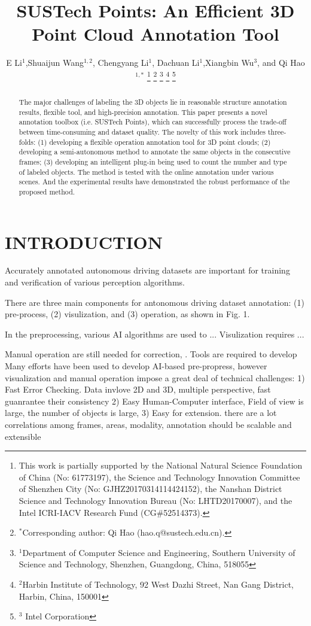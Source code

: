 \documentclass[letterpaper, 10 pt, conference]{ieeeconf}  %
\title{\LARGE \bf
SUSTech Points: An Efficient 3D Point Cloud Annotation Tool
}
\author{E Li$^{1}$,Shuaijun Wang$^{1,2}$,  Chengyang Li$^{1}$, Dachuan Li$^{1}$,Xiangbin Wu$^{3}$, and Qi Hao$^{1,*}$%
\thanks{This work is partially supported by the National Natural Science Foundation of China (No: 61773197), the Science and Technology Innovation Committee of Shenzhen City (No: GJHZ20170314114424152), the Nanshan District Science and Technology Innovation Bureau (No: LHTD20170007), and the Intel ICRI-IACV Research Fund (CG$\#$52514373).}
\thanks{$^{*}$Corresponding author: Qi Hao (hao.q@sustech.edu.cn).}
\thanks{$^{1}$Department of Computer Science and Engineering,
Southern University of Science and Technology, Shenzhen, Guangdong, China, 518055}
\thanks{$^{2}$Harbin Institute of Technology,
92 West Dazhi Street, Nan Gang District, Harbin, China, 150001}%
\thanks{$^{3}$ Intel Corporation}%
}
\begin{document}
\maketitle
\thispagestyle{empty}
\pagestyle{empty}
\begin{abstract}
The major challenges of labeling the 3D objects lie in reasonable structure annotation results, flexible tool, and high-precision annotation. This paper presents a novel annotation toolbox (i.e. SUSTech Points), which can successfully process the trade-off between time-consuming and dataset quality. The novelty of this work includes three-folds: (1) developing a flexible operation annotation tool for 3D point clouds; (2) developing a semi-autonomous method to annotate the same objects in the consecutive frames; (3) developing an intelligent plug-in being used to count the number and type of labeled objects. The method is tested with the online annotation under various scenes. And the experimental results have demonstrated the robust performance of the proposed method.
\end{abstract}






\section{INTRODUCTION}

Accurately annotated autonomous driving datasets are important for training and verification of various perception algorithms.

There are three main components for antonomous driving dataset annotation: (1) pre-process, (2) visulization, and (3) operation, as shown in Fig. 1.

In the preprocessing, various AI algorithms are used to ...
Visulization requires ...

Manual operation are still needed for correction, . 
Tools are required to develop 
Many efforts have been used to develop AI-based pre-propress, however
visualization and manual operation impose a great deal of technical challenges:
1) Fast Error Checking. Data invlove 2D and 3D, multiple perspective, fast guanrantee their consistency
2) Easy Human-Computer interface, Field of view is large, the number of objects is large, 
3) Easy for extension. there are a lot correlations among frames, areas, modality, annotation should be scalable and extensible
\end{document}
